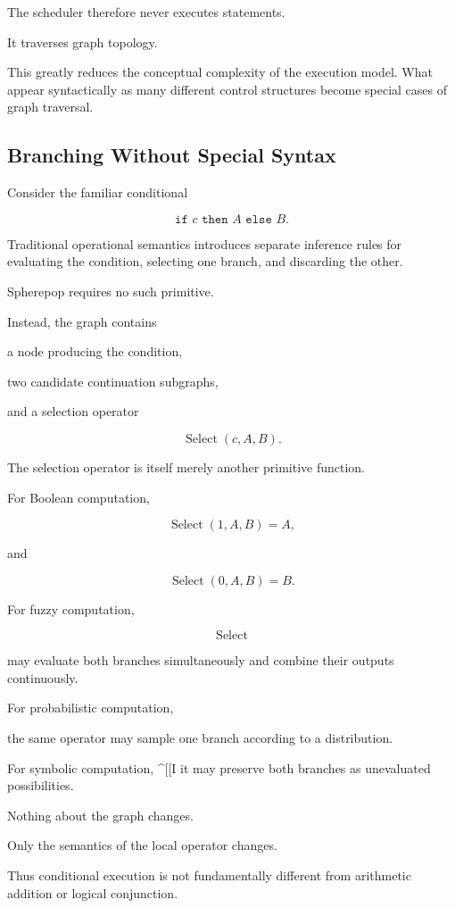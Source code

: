 \documentclass[12pt,oneside]{article}
\begin{document}
The scheduler therefore never executes statements.

It traverses graph topology.

This greatly reduces the conceptual complexity of the execution model. What appear syntactically as many different control structures become special cases of graph traversal.

\subsection{Branching Without Special Syntax}

Consider the familiar conditional

\[
\texttt{if }c\texttt{ then }A\texttt{ else }B.
\]

Traditional operational semantics introduces separate inference rules for evaluating the condition, selecting one branch, and discarding the other.

Spherepop requires no such primitive.

Instead, the graph contains

a node producing the condition,

two candidate continuation subgraphs,

and a selection operator

\[
\operatorname{Select}(c,A,B).
\]

The selection operator is itself merely another primitive function.

For Boolean computation,

\[
\operatorname{Select}(1,A,B)=A,
\]

and

\[
\operatorname{Select}(0,A,B)=B.
\]

For fuzzy computation,

\[
\operatorname{Select}
\]

may evaluate both branches simultaneously and combine their outputs continuously.

For probabilistic computation,

the same operator may sample one branch according to a distribution.

For symbolic computation,
^[[I
it may preserve both branches as unevaluated possibilities.

Nothing about the graph changes.

Only the semantics of the local operator changes.

Thus conditional execution is not fundamentally different from arithmetic addition or logical conjunction.
\end{document}
